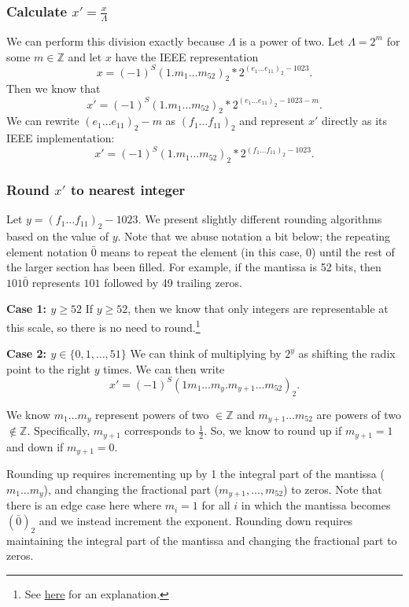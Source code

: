 \documentclass[11pt]{scrartcl} %
\begin{document}
\subsubsection{Calculate $x' = \frac{x}{\Lambda}$}
We can perform this division exactly because $\Lambda$ is a power of two. Let $\Lambda = 2^m$ for some $m \in \mathbb{Z}$ and let $x$ have the IEEE representation
\[ x = (-1)^S (1.m_{1} \hdots m_{52})_2 * 2^{(e_1 \hdots e_{11})_2-1023}. \]
Then we know that
\[ x' = (-1)^S (1.m_{1} \hdots m_{52})_2 * 2^{(e_1 \hdots e_{11})_2-1023-m}. \]
We can rewrite $(e_1 \hdots e_{11})_2 - m$ as $(f_1 \hdots f_{11})_2$ and represent $x'$ directly as its IEEE implementation:
\[ x' = (-1)^S (1.m_{1} \hdots m_{52})_2 * 2^{(f_1 \hdots f_{11})_2-1023}. \]

\subsubsection{Round $x'$ to nearest integer}
Let $y = (f_1 \hdots f_{11})_2-1023$. We present slightly different rounding algorithms based on the value of $y$. Note that we abuse notation a bit below; the repeating element notation $\bar{0}$ means to repeat the element (in this case, 0) until the rest of the larger section has been filled. For example, if the mantissa is 52 bits, then $101\bar{0}$ represents $101$ followed by 49 trailing zeros. \newline

\textbf{Case 1: $y \geq 52$} \newline
If $y \geq 52$, then we know that only integers are representable at this scale, so there is no need to round.\footnote{See \href{https://www.exploringbinary.com/the-spacing-of-binary-floating-point-numbers/}{here} for an explanation.} \newline

\textbf{Case 2: $y \in \{0, 1, \hdots, 51\}$} \newline
We can think of multiplying by $2^y$ as shifting the radix point to the right $y$ times. We can then write
\[ x' = (-1)^S (1m_1 \hdots m_y.m_{y+1} \hdots m_{52})_2. \]

We know $m_1 \hdots m_y$ represent powers of two $\in \mathbb{Z}$ and $m_{y+1} \hdots m_{52}$ are powers of two $\not \in \mathbb{Z}$. Specifically, $m_{y+1}$ corresponds to $\frac{1}{2}$. So, we know to round up if $m_{y+1} = 1$ and down if $m_{y+1} = 0$. \newline

Rounding up requires incrementing up by 1 the integral part of the mantissa ($m_1 \hdots m_y$), and changing the fractional part ($m_{y+1}, \hdots, m_{52}$) to zeros. Note that there is an edge case here where $m_i = 1$ for all $i$ in which the mantissa becomes $(\bar{0})_2$ and we instead increment the exponent. Rounding down requires maintaining the integral part of the mantissa and changing the fractional part to zeros. \newline
\end{document}
